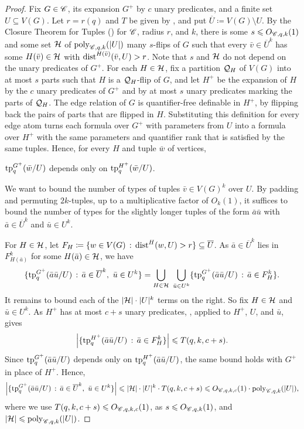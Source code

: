 \begin{proof}
    Fix $G\in\mathscr C$, its expansion $G^+$ by $c$ unary predicates, and a finite set $U\subseteq V(G)$.
    Let $r=r(q)$ and $T$ be given by , and put $\overline{U}\coloneqq V(G)\setminus U$.
    By the Closure Theorem for Tuples () for $\mathscr C$, radius $r$, and $k$, there is some $s\leqslant O_{\mathscr C,q,k}(1)$ and some set $\mathcal H$ of $\mathrm{poly}_{\mathscr C,q,k}(|U|)$ many $s$-flips of $G$ such that every $\bar v\in\overline{U}^k$ has some $H(\bar v)\in\mathcal H$ with $\mathrm{dist}^{H(\bar v)}(\bar v,U)>r$.
    Note that $s$ and $\mathcal H$ do not depend on the unary predicates of $G^+$.
    For each $H\in\mathcal H$, fix a partition $\mathcal Q_H$ of $V(G)$ into at most $s$ parts such that $H$ is a $\mathcal Q_H$-flip of $G$, and let $H^+$ be the expansion of $H$ by the $c$ unary predicates of $G^+$ and by at most $s$ unary predicates marking the parts of $\mathcal Q_H$.
    The edge relation of $G$ is quantifier-free definable in $H^+$, by flipping back the pairs of parts that are flipped in $H$.
    Substituting this definition for every edge atom turns each formula over $G^+$ with parameters from $U$ into a formula over $H^+$ with the same parameters and quantifier rank that is satisfied by the same tuples.
    Hence, for every $H$ and tuple $\bar w$ of vertices,
    \begin{center}
        $\textnormal{tp}_q^{G^+}(\bar w/U)$ depends only on $\textnormal{tp}_q^{H^+}(\bar w/U)$.
    \end{center}

    We want to bound the number of types of tuples $\bar v \in V(G)^k$ over $U$.
    By padding and permuting $2k$-tuples, up to a multiplicative factor of $O_k(1)$, it suffices to bound the number of types for the slightly longer tuples of the form $\bar a\bar u$ with $\bar a \in \overline{U}^k$ and $\bar u \in U^k$.
    
    For $H\in\mathcal H$, let $F_H\coloneqq\{w\in V(G) \,:\, \mathrm{dist}^H(w,U)>r\} \subseteq \overline{U}$.
    As $\bar a\in\overline{U}^k$ lies in $F_{H(\bar a)}^k$ for some $H(\bar a) \in \mathcal H$, we have
    \[
        \{\textnormal{tp}_q^{G^+}(\bar a\bar u/U) \,:\, \bar a\in\overline{U}^k,\ \bar u\in U^k\}
        =
        \bigcup_{H\in\mathcal H}\ \bigcup_{\bar u\in U^k}
        \{\textnormal{tp}_q^{G^+}(\bar a\bar u/U) \,:\, \bar a\in F_H^k\}.
    \]
    It remains to bound each of the $|\mathcal H|\cdot|U|^k$ terms on the right.
    So fix $H\in\mathcal H$ and $\bar u\in U^k$.
    As $H^+$ has at most $c+s$ unary predicates, , applied to $H^+$, $U$, and $\bar u$, gives
    \[
        \left|\{\textnormal{tp}_q^{H^+}(\bar a\bar u/U) \,:\, \bar a\in F_H^k\}\right|
        \leqslant T(q,k,c+s).
    \]
    Since $\textnormal{tp}_q^{G^+}(\bar a\bar u/U)$ depends only on $\textnormal{tp}_q^{H^+}(\bar a\bar u/U)$, the same bound holds with $G^+$ in place of $H^+$.
    Hence,
    \[
        \left|\{\textnormal{tp}_q^{G^+}(\bar a\bar u/U) \,:\, \bar a\in\overline{U}^k,\ \bar u\in U^k\}\right|
        \leqslant|\mathcal H|\cdot|U|^k\cdot T(q,k,c+s)
        \leqslant O_{\mathscr C,q,k,c}(1)\cdot\mathrm{poly}_{\mathscr C,q,k}(|U|),
    \]
    where we use $T(q,k,c+s)\leqslant O_{\mathscr C,q,k,c}(1)$, as $s\leqslant O_{\mathscr C,q,k}(1)$, and $|\mathcal H|\leqslant\mathrm{poly}_{\mathscr C,q,k}(|U|)$.
\end{proof}

